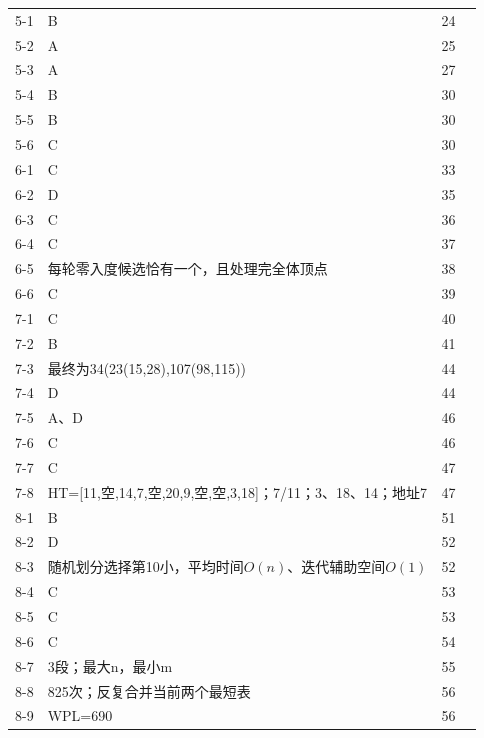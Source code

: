 \documentclass{sidenotes-simplex}
\begin{document}
{\begin{longtable}{@{}p{18mm}p{87mm}p{20mm}p{20mm}@{}}
5-1 & B & 24 & \hyperref[a:DS05-E01]{\pageref*{a:DS05-E01}} \\
5-2 & A & 25 & \hyperref[a:DS05-E02]{\pageref*{a:DS05-E02}} \\
5-3 & A & 27 & \hyperref[a:DS05-E03]{\pageref*{a:DS05-E03}} \\
5-4 & B & 30 & \hyperref[a:DS05-E04]{\pageref*{a:DS05-E04}} \\
5-5 & B & 30 & \hyperref[a:DS05-E05]{\pageref*{a:DS05-E05}} \\
5-6 & C & 30 & \hyperref[a:DS05-E06]{\pageref*{a:DS05-E06}} \\
6-1 & C & 33 & \hyperref[a:DS06-E01]{\pageref*{a:DS06-E01}} \\
6-2 & D & 35 & \hyperref[a:DS06-E02]{\pageref*{a:DS06-E02}} \\
6-3 & C & 36 & \hyperref[a:DS06-E03]{\pageref*{a:DS06-E03}} \\
6-4 & C & 37 & \hyperref[a:DS06-E04]{\pageref*{a:DS06-E04}} \\
6-5 & 每轮零入度候选恰有一个，且处理完全体顶点 & 38 & \hyperref[a:DS06-E05]{\pageref*{a:DS06-E05}} \\
6-6 & C & 39 & \hyperref[a:DS06-E06]{\pageref*{a:DS06-E06}} \\
7-1 & C & 40 & \hyperref[a:DS07-E01]{\pageref*{a:DS07-E01}} \\
7-2 & B & 41 & \hyperref[a:DS07-E02]{\pageref*{a:DS07-E02}} \\
7-3 & 最终为34(23(15,28),107(98,115)) & 44 & \hyperref[a:DS07-E03]{\pageref*{a:DS07-E03}} \\
7-4 & D & 44 & \hyperref[a:DS07-E04]{\pageref*{a:DS07-E04}} \\
7-5 & A、D & 46 & \hyperref[a:DS07-E05]{\pageref*{a:DS07-E05}} \\
7-6 & C & 46 & \hyperref[a:DS07-E06]{\pageref*{a:DS07-E06}} \\
7-7 & C & 47 & \hyperref[a:DS07-E07]{\pageref*{a:DS07-E07}} \\
7-8 & HT={[}11,空,14,7,空,20,9,空,空,3,18{]}；7/11；3、18、14；地址7 & 47 & \hyperref[a:DS07-E08]{\pageref*{a:DS07-E08}} \\
8-1 & B & 51 & \hyperref[a:DS08-E01]{\pageref*{a:DS08-E01}} \\
8-2 & D & 52 & \hyperref[a:DS08-E02]{\pageref*{a:DS08-E02}} \\
8-3 & 随机划分选择第10小，平均时间\(O(n)\)、迭代辅助空间\(O(1)\) & 52 & \hyperref[a:DS08-E09]{\pageref*{a:DS08-E09}} \\
8-4 & C & 53 & \hyperref[a:DS08-E03]{\pageref*{a:DS08-E03}} \\
8-5 & C & 53 & \hyperref[a:DS08-E04]{\pageref*{a:DS08-E04}} \\
8-6 & C & 54 & \hyperref[a:DS08-E05]{\pageref*{a:DS08-E05}} \\
8-7 & 3段；最大n，最小m & 55 & \hyperref[a:DS08-E06]{\pageref*{a:DS08-E06}} \\
8-8 & 825次；反复合并当前两个最短表 & 56 & \hyperref[a:DS08-E07]{\pageref*{a:DS08-E07}} \\
8-9 & WPL=690 & 56 & \hyperref[a:DS08-E08]{\pageref*{a:DS08-E08}} \\
\end{longtable}}
\end{document}
